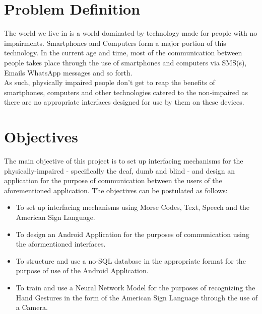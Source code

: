 \documentclass[14pt]{report}
\renewcommand{\headrulewidth}{2pt}
\renewcommand{\footrulewidth}{0.4pt}
\begin{document}
	
		\fancypagestyle{plain}{%
		\fancyhf{}%
		\fancyfoot[R]{Page \thepage}%
		\renewcommand{\headrulewidth}{0pt}%
		\renewcommand{\footrulewidth}{0.4pt}%
		}

		\section{Problem Definition}
			The world we live in is a world dominated by technology made for people with no impairments. Smartphones and Computers form a major portion of this technology. In the current age and time, most of the communication between people takes place through the use of smartphones and computers via SMS(s), Emails WhatsApp messages and so forth. \\
			
			As such, physically impaired people don't get to reap the benefits of smartphones, computers and other technologies catered to the non-impaired as there are no appropriate interfaces designed for use by them on these devices.
		
			\section{Objectives}
			The main objective of this project is to set up interfacing mechanisms for the physically-impaired - specifically the deaf, dumb and blind - and design an application for the purpose of communication between the users of the aforementioned application. The objectives can be postulated as follows:
			\begin{itemize}
				\item To set up interfacing mechanisms using Morse Codes, Text, Speech and the American Sign Language. 
				\item To design an Android Application for the purposes of communication using the aformentioned interfaces.
				\item To structure and use a no-SQL database in the appropriate format for the purpose of use of the Android Application.
				\item To train and use a Neural Network Model for the purposes of recognizing the Hand Gestures in the form of the American Sign Language through the use of a Camera.
			\end{itemize}
\end{document}
